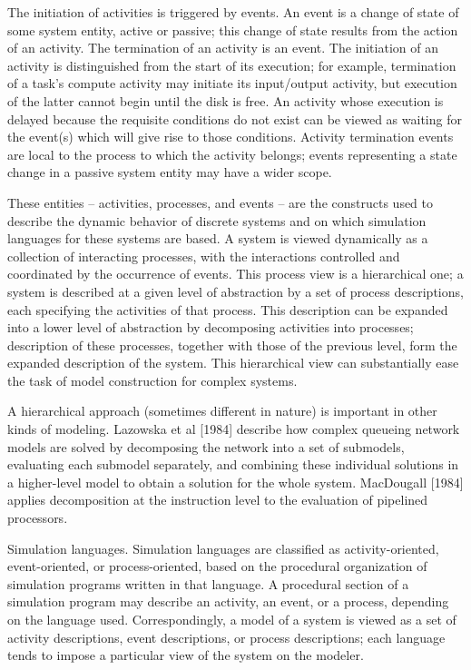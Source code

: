 The initiation of activities is triggered by events. An event is a change of
state of some system entity, active or passive; this change of state results
from the action of an activity. The termination of an activity is an event.
The initiation of an activity is distinguished from the start of its execution;
for example, termination of a task's compute activity may initiate its
input/output activity, but execution of the latter cannot begin until the disk
is free. An activity whose execution is delayed because the requisite
conditions do not exist can be viewed as waiting for the event(s) which will
give rise to those conditions. Activity termination events are local to the
process to which the activity belongs; events representing a state change in a
passive system entity may have a wider scope.

These entities -- activities, processes, and events -- are the constructs used
to describe the dynamic behavior of discrete systems and on which simulation
languages for these systems are based. A system is viewed dynamically as a
collection of interacting processes, with the interactions controlled and
coordinated by the occurrence of events. This process view is a hierarchical
one; a system is described at a given level of abstraction by a set of process
descriptions, each specifying the activities of that process. This description
can be expanded into a lower level of abstraction by decomposing activities
into processes; description of these processes, together with those of the
previous level, form the expanded description of the system. This hierarchical
view can substantially ease the task of model construction for complex systems.

A hierarchical approach (sometimes different in nature) is important in other
kinds of modeling. Lazowska et al [1984] describe how complex queueing network
models are solved by decomposing the network into a set of submodels,
evaluating each submodel separately, and combining these individual solutions
in a higher-level model to obtain a solution for the whole system. MacDougall
[1984] applies decomposition at the instruction level to the evaluation of
pipelined processors.

Simulation languages. Simulation languages are classified as activity-oriented,
event-oriented, or process-oriented, based on the procedural organization of
simulation programs written in that language. A procedural section of a
simulation program may describe an activity, an event, or a process, depending
on the language used. Correspondingly, a model of a system is viewed as a set
of activity descriptions, event descriptions, or process descriptions; each
language tends to impose a particular view of the system on the modeler.

